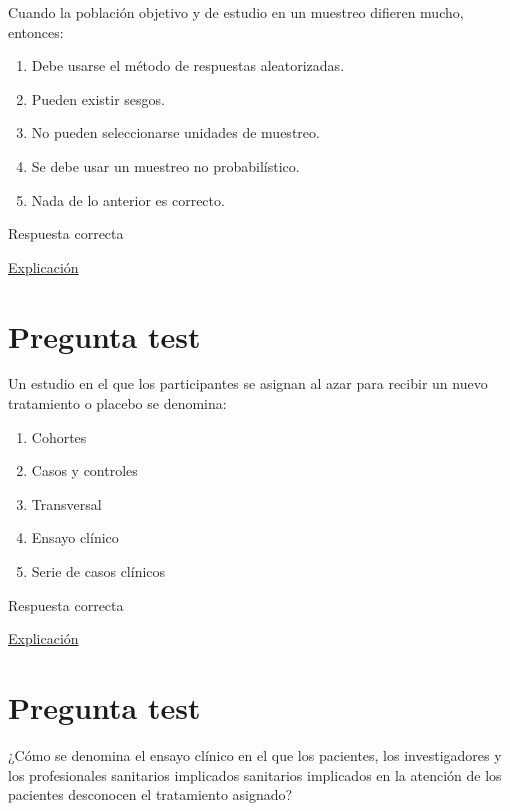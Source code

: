 \documentclass[
]{book}
\providecommand{\tightlist}{%
  \setlength{\itemsep}{0pt}\setlength{\parskip}{0pt}}
\begin{document}
Cuando la población objetivo y de estudio en un muestreo difieren mucho, entonces:

\begin{enumerate}
\def\labelenumi{\alph{enumi})}
\tightlist
\item
  Debe usarse el método de respuestas aleatorizadas.
\item
  Pueden existir sesgos.
\item
  No pueden seleccionarse unidades de muestreo.
\item
  Se debe usar un muestreo no probabilístico.
\item
  Nada de lo anterior es correcto.
\end{enumerate}

Respuesta correcta

\href{https://www.cancer.gov/espanol/publicaciones/diccionarios/diccionario-cancer/def/sesgo}{Explicación}

\hypertarget{pregunta-test-47}{%
\section{Pregunta test}\label{pregunta-test-47}}

Un estudio en el que los participantes se asignan al azar para recibir un nuevo tratamiento o placebo se denomina:

\begin{enumerate}
\def\labelenumi{\alph{enumi})}
\tightlist
\item
  Cohortes
\item
  Casos y controles
\item
  Transversal
\item
  Ensayo clínico
\item
  Serie de casos clínicos
\end{enumerate}

Respuesta correcta

\href{https://www.geicam.org/que-hacemos/ensayos-clinicos/que-es-un-ensayo-clinico}{Explicación}

\hypertarget{pregunta-test-48}{%
\section{Pregunta test}\label{pregunta-test-48}}

¿Cómo se denomina el ensayo clínico en el que los pacientes, los investigadores y los profesionales sanitarios implicados sanitarios implicados en la atención de los pacientes desconocen el tratamiento asignado?
\end{document}
